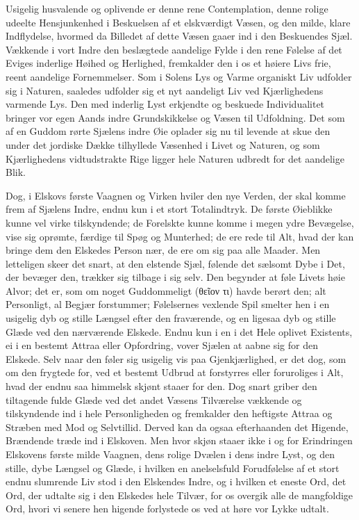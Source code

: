 \documentclass[12pt,a4paper]{book}
\newcommand{\apage}[1]{\marginnote{\footnotesize\textit{[#1]}}}
\begin{document}
Usigelig husvalende og oplivende er denne rene Contemplation, denne
rolige udeelte Hensjunkenhed i Beskuelsen af et elskværdigt Væsen, og
den milde, klare Indflydelse, hvormed da Billedet af dette Væsen gaaer
ind i den Beskuendes Sjæl. Vækkende i vort Indre den beslægtede
aandelige Fylde i den rene Følelse af det Eviges inderlige Høihed og
Herlighed, fremkalder den i os et høiere Livs frie, reent aandelige
Fornemmelser. Som i Solens Lys og Varme organiskt Liv udfolder sig i
Naturen, saaledes udfolder sig et nyt aandeligt Liv ved Kjærlighedens
varmende Lys. Den med inderlig Lyst erkjendte og beskuede Individualitet
bringer vor egen Aands indre Grundskikkelse og Væsen til Udfoldning.
Det som af en Guddom rørte Sjælens indre Øie oplader sig nu til levende
at skue den under det jordiske Dække tilhyllede Væsenhed i Livet og
Naturen, og som \apage{18} Kjærlighedens vidtudstrakte Rige ligger hele Naturen
udbredt for det aandelige Blik.

Dog, i Elskovs første Vaagnen og Virken hviler den nye Verden, der skal
komme frem af Sjælens Indre, endnu kun i et stort Totalindtryk. De
første Øieblikke kunne vel virke tilskyndende; de Forelskte kunne komme
i megen ydre Bevægelse, vise sig oprømte, færdige til Spøg og
Munterhed; de ere rede til Alt, hvad der kan bringe dem den Elskedes
Person nær, de ere om sig paa alle Maader. Men letteligen skeer det
snart, at den elstende Sjæl, følende det sælsomt Dybe i Det, der bevæger
den, trækker sig tilbage i sig selv. Den begynder at føle Livets høie
Alvor; det er, som om noget Guddommeligt (θεῖον τι) havde berørt den;
alt Personligt, al Begjær forstummer; Følelsernes vexlende Spil smelter
hen i en usigelig dyb og stille Længsel efter den fraværende, og en
ligesaa dyb og stille Glæde ved den nærværende Elskede. Endnu kun i en
i det Hele oplivet Existents, ei i en bestemt Attraa eller Opfordring,
vover Sjælen at aabne sig for den Elskede. Selv naar den føler sig
usigelig vis paa Gjenkjærlighed, er det dog, som om den frygtede for,
ved et bestemt Udbrud at forstyrres eller foruroliges i Alt, hvad der
endnu saa himmelsk skjønt staaer for den. Dog snart griber den
tiltagende fulde Glæde ved det andet Væsens Tilværelse vækkende og
tilskyndende ind i hele Personligheden og fremkalder den heftigste
Attraa og Stræben med Mod og Selvtillid. Derved kan da ogsaa \apage{19} efterhaanden
det Higende, Brændende træde ind i Elskoven. Men hvor skjøn staaer ikke
i og for Erindringen Elskovens første milde Vaagnen, dens rolige Dvælen
i dens indre Lyst, og den stille, dybe Længsel og Glæde, i hvilken en
anelselsfuld Forudfølelse af et stort endnu slumrende Liv stod i den
Elskendes Indre, og i hvilken et eneste Ord, det Ord, der udtalte sig i
den Elskedes hele Tilvær, for os overgik alle de mangfoldige Ord, hvori
vi senere hen higende forlystede os ved at høre vor Lykke udtalt.
\end{document}

